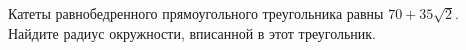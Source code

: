 \begin{ex}
	\begin{condition}
		Катеты равнобедренного прямоугольного треугольника равны \( 70+35\sqrt{2} \). Найдите радиус окружности, вписанной в этот треугольник.
	\end{condition}
\end{ex}